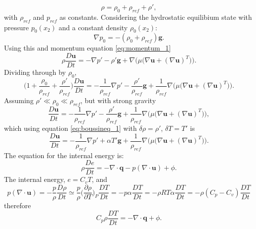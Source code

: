 \documentclass[preprint,12pt]{article}
\begin{document}
\begin{equation}
\rho=\rho_0+\rho_{ref}+\rho',
\end{equation}
with $\rho_{ref}$ and $p_{ref}$ as constants. Considering the hydrostatic equilibium state with pressure $p_0(x_2)$ and a constant density $\rho_0(x_2)$:
\begin{equation}
\nabla p_0=-(\rho_0+\rho_{ref}) \mathbf{g}.
\end{equation}
Using this and momentum equation \eqref{eq:momentum_1} 
\begin{equation}
\rho\frac{D\mathbf{u}}{Dt}=-\nabla p'-\rho' \mathbf{g}+\nabla\Big(\mu\big(\nabla \mathbf{u}+(\nabla \mathbf{u})^T\big)\Big).
\end{equation}
Dividing through by $\rho_0$,
\begin{equation}
\Bigg(1+\frac{\rho_{0}}{\rho_{ref}}+\frac{\rho'}{\rho_{ref}}\Bigg)\frac{D\mathbf{u}}{Dt}=-\frac{1}{\rho_{ref}}\nabla p'-\frac{\rho'}{\rho_{ref}} \mathbf{g}+\frac{1}{\rho_{ref}}\nabla\Big(\mu\big(\nabla \mathbf{u}+(\nabla \mathbf{u})^T\big)\Big).
\end{equation}
Assuming $\rho'\ll \rho_0\ll \rho_{ref}$,  but with strong gravity
\begin{equation}
\frac{D\mathbf{u}}{Dt}=-\frac{1}{\rho_{ref}}\nabla p'-\frac{\rho'}{\rho_{ref}} \mathbf{g}+\frac{1}{\rho_{ref}}\nabla\Big(\mu\big(\nabla \mathbf{u}+(\nabla \mathbf{u})^T\big)\Big),
\end{equation}
which using equation \eqref{eq:boussineq_1} with $\delta \rho=\rho'$, $\delta T=T'$ is
\begin{equation}\label{eq:Momentum}
\frac{D\mathbf{u}}{Dt}=-\frac{1}{\rho_{ref}}\nabla p'+\alpha T' \mathbf{g}+\frac{1}{\rho_{ref}}\nabla\Big(\mu\big(\nabla \mathbf{u}+(\nabla \mathbf{u})^T\big)\Big).
\end{equation}
The equation for the internal energy is:
\begin{equation}
\rho\frac{D e}{D t}=-\nabla\cdot \mathbf{q}-p(\nabla\cdot \mathbf{u})+\phi.
\end{equation}
The internal energy, $e=C_v T$, and
\begin{equation}
p(\nabla\cdot \mathbf{u})=-\frac{p}{\rho}\frac{D\rho}{Dt}\simeq \frac{p}{\rho}\bigg(\frac{\partial \rho}{\partial T}\bigg)_P\frac{DT}{Dt}=-p\alpha \frac{D T}{Dt}=-\rho R T \alpha \frac{D T}{Dt}=-\rho(C_p-C_v)\frac{D T}{Dt}
\end{equation}
therefore
\begin{equation}\label{eq:energy_1}
C_p\rho\frac{D T}{D t}=-\nabla\cdot \mathbf{q}+\phi.
\end{equation}
\end{document}
